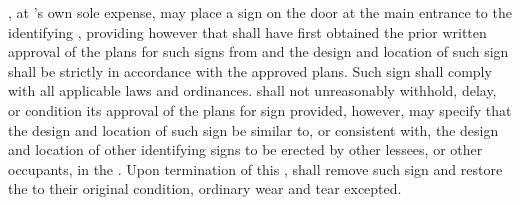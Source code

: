 \lessee, at \lessee's own sole expense, may place a sign on the door at the main entrance to the \premises identifying \lessee, providing however that \lessee shall have first obtained the prior written approval of the plans for such signs from \lessor and the design and location of such sign shall be strictly in accordance with the approved plans. Such sign shall comply with all applicable laws and ordinances. \lessee shall not unreasonably withhold, delay, or condition its approval of the plans for sign provided, however, \lessor may specify that the design and location of such sign be similar to, or consistent with, the design and location of other identifying signs to be erected by other lessees, or other occupants, in the \building. Upon termination of this \lease, \lessee shall remove such sign and restore the \premises to their original condition, ordinary wear and tear excepted.
